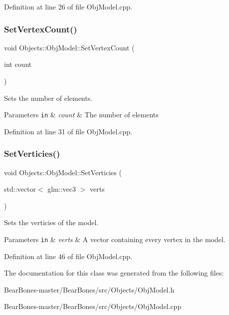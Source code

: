Definition at line 26 of file Obj\+Model.\+cpp.

\mbox{\label{class_objects_1_1_obj_model_a863d5f8618de5bf3cc52de85181f178b}} 
\subsubsection{\texorpdfstring{Set\+Vertex\+Count()}{SetVertexCount()}}
{\footnotesize\ttfamily void Objects\+::\+Obj\+Model\+::\+Set\+Vertex\+Count (\begin{DoxyParamCaption}\item[{int}]{count }\end{DoxyParamCaption})}

Sets the number of elements. 
\begin{DoxyParams}[1]{Parameters}
\mbox{\tt in}  & {\em count} & The number of elements \\
\hline
\end{DoxyParams}


Definition at line 31 of file Obj\+Model.\+cpp.

\mbox{\label{class_objects_1_1_obj_model_aea0369b1cff1d80289d6378e8b98bc57}} 
\subsubsection{\texorpdfstring{Set\+Verticies()}{SetVerticies()}}
{\footnotesize\ttfamily void Objects\+::\+Obj\+Model\+::\+Set\+Verticies (\begin{DoxyParamCaption}\item[{std\+::vector$<$ glm\+::vec3 $>$}]{verts }\end{DoxyParamCaption})}

Sets the verticies of the model. 
\begin{DoxyParams}[1]{Parameters}
\mbox{\tt in}  & {\em verts} & A vector containing every vertex in the model. \\
\hline
\end{DoxyParams}


Definition at line 46 of file Obj\+Model.\+cpp.



The documentation for this class was generated from the following files\+:\begin{DoxyCompactItemize}
\item 
Bear\+Bones-\/master/\+Bear\+Bones/src/\+Objects/Obj\+Model.\+h\item 
Bear\+Bones-\/master/\+Bear\+Bones/src/\+Objects/Obj\+Model.\+cpp\end{DoxyCompactItemize}
